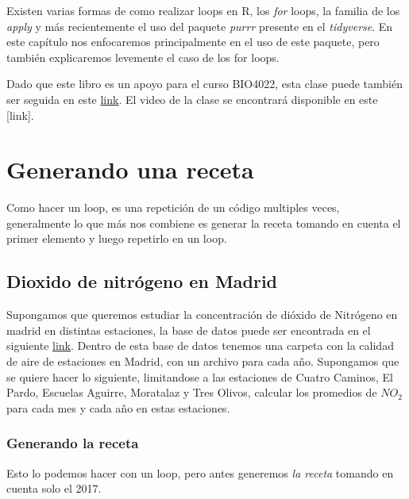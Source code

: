 \documentclass[]{book}
\begin{document}
Existen varias formas de como realizar loops en R, los \emph{for} loops,
la familia de los \emph{apply} y más recientemente el uso del paquete
\emph{purrr} \citep{HenryPurrr} presente en el \emph{tidyverse}. En este
capítulo nos enfocaremos principalmente en el uso de este paquete, pero
también explicaremos levemente el caso de los for loops.

Dado que este libro es un apoyo para el curso BIO4022, esta clase puede
también ser seguida en este
\href{https://derek-corcoran-barrios.github.io/Clase6/Clase6Loopsybibliografia}{link}.
El video de la clase se encontrará disponible en este {[}link{]}.

\hypertarget{generando-una-receta}{%
\section{Generando una receta}\label{generando-una-receta}}

Como hacer un loop, es una repetición de un código multiples veces,
generalmente lo que más nos combiene es generar la receta tomando en
cuenta el primer elemento y luego repetirlo en un loop.

\hypertarget{dioxido-de-nitrogeno-en-madrid}{%
\subsection{Dioxido de nitrógeno en
Madrid}\label{dioxido-de-nitrogeno-en-madrid}}

Supongamos que queremos estudiar la concentración de dióxido de
Nitrógeno en madrid en distintas estaciones, la base de datos puede ser
encontrada en el siguiente
\href{https://www.kaggle.com/decide-soluciones/air-quality-madrid}{link}.
Dentro de esta base de datos tenemos una carpeta con la calidad de aire
de estaciones en Madrid, con un archivo para cada año. Supongamos que se
quiere hacer lo siguiente, limitandose a las estaciones de Cuatro
Caminos, El Pardo, Escuelas Aguirre, Moratalaz y Tres Olivos, calcular
los promedios de \(NO_2\) para cada mes y cada año en estas estaciones.

\hypertarget{generando-la-receta}{%
\subsubsection{Generando la receta}\label{generando-la-receta}}

Esto lo podemos hacer con un loop, pero antes generemos \emph{la receta}
tomando en cuenta solo el 2017.
\end{document}
